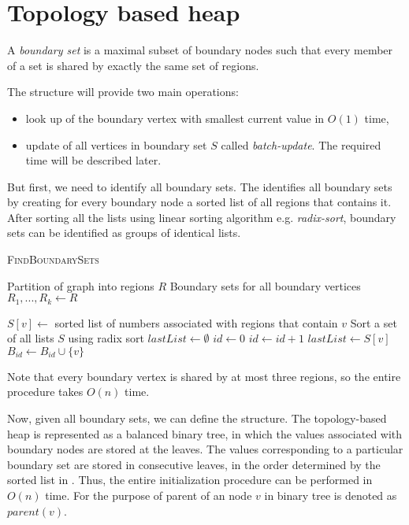 \section{Topology based heap}

\begin{defn}
A \emph{boundary set} is a maximal subset of boundary nodes such that every member of a set is shared by exactly the same set of regions.
\end{defn}

The structure will provide two main operations:

\begin{itemize}
    \item look up of the boundary vertex with smallest current value in $O(1)$ time,
    \item update of all vertices in boundary set $S$ called \emph{batch-update}. The required time will be described later.
\end{itemize}

But first, we need to identify all boundary sets. The  identifies all boundary sets by creating for every boundary node a sorted list of all regions that contains it. After sorting all the lists using linear sorting algorithm e.g. \emph{radix-sort}, boundary sets can be identified as groups of identical lists.

\begin{algorithm}
\caption{\textsc{FindBoundarySets}}\label{sortsets}
\begin{algorithmic}[1]
\Require Partition of graph into regions $R$
\Ensure Boundary sets for all boundary vertices
\State ${R_1,..., R_k} \gets R$ 

    \State $S[v] \gets$ sorted list of numbers associated with regions that contain $v$
\EndFor
\State Sort a set of all lists $S$ using radix sort
\State $lastList \gets \emptyset$
\State $id \gets 0$
        \State $id \gets id + 1$
        \State $lastList \gets S[v]$
    \EndIf 
    \State $B_{id} \gets B_{id} \cup \{v\}$
\EndFor
\State {}
\end{algorithmic}
\end{algorithm}


Note that every boundary vertex is shared by at most three regions, so the entire procedure takes $O(n)$ time.

Now, given all boundary sets, we can define the structure. The topology-based heap is represented as a balanced binary tree, in which the values associated with boundary nodes are stored at the leaves. The values corresponding to a particular boundary set are stored in consecutive leaves, in the order determined by the sorted list in . Thus, the entire initialization procedure can be performed in $O(n)$ time. For the purpose of  parent of an node $v$ in binary tree is denoted as $parent(v)$.

